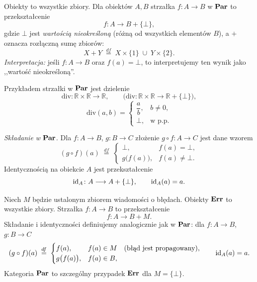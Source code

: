 \begin{przyklad}
Obiekty to wszystkie zbiory. Dla obiektów $A, B$ strzałka $f \colon A \to B$ w $\mathbf{Par}$ to przekształcenie
\[
f \colon A \longrightarrow B + \{\bot\},
\]
gdzie $\bot$ jest \emph{wartością nieokreśloną} (różną od wszystkich elementów $B$), a $+$ oznacza rozłączną sumę zbiorów:
\[
X + Y \;\stackrel{df}{=}\; X \times \{1\} \;\cup\; Y \times \{2\}.
\]
\emph{Interpretacja:} jeśli $f \colon A \to B$ oraz $f(a) = \bot$, to interpretujemy ten wynik jako ,,wartość nieokreśloną''.

Przykładem strzałki w $\mathbf{Par}$ jest dzielenie
\[
\mathrm{div} \colon \mathbb{R} \times \mathbb{R} \longrightarrow \mathbb{R}, \qquad
\bigl(\mathrm{div} \colon \mathbb{R} \times \mathbb{R} \longrightarrow \mathbb{R} + \{\bot\}\bigr),
\]
\[
\mathrm{div}(a, b) = \begin{cases} \dfrac{a}{b}, & b \neq 0, \\ \bot, & \text{w p.p.} \end{cases}
\]

\emph{Składanie w $\mathbf{Par}$.} Dla $f \colon A \to B$, $g \colon B \to C$ złożenie $g \circ f \colon A \to C$ jest dane wzorem
\[
(g \circ f)(a) \;\stackrel{df}{=}\;
\begin{cases}
\bot, & f(a) = \bot, \\
g\bigl(f(a)\bigr), & f(a) \neq \bot.
\end{cases}
\]
Identycznością na obiekcie $A$ jest przekształcenie
\[
\mathrm{id}_A \colon A \longrightarrow A + \{\bot\}, \qquad \mathrm{id}_A(a) = a.
\]
\end{przyklad}

\begin{przyklad}
Niech $M$ będzie ustalonym zbiorem wiadomości o błędach. Obiekty $\mathbf{Err}$ to wszystkie zbiory. Strzałka $f \colon A \to B$ to przekształcenie
\[
f \colon A \longrightarrow B + M.
\]
Składanie i identyczności definiujemy analogicznie jak w $\mathbf{Par}$: dla $f \colon A \to B$, $g \colon B \to C$
\[
(g \circ f)(a) \;\stackrel{df}{=}\;
\begin{cases}
f(a), & f(a) \in M \quad (\text{błąd jest propagowany}), \\
g\bigl(f(a)\bigr), & f(a) \in B,
\end{cases}
\qquad \mathrm{id}_A(a) = a.
\]
Kategoria $\mathbf{Par}$ to szczególny przypadek $\mathbf{Err}$ dla $M = \{\bot\}$.
\end{przyklad}

